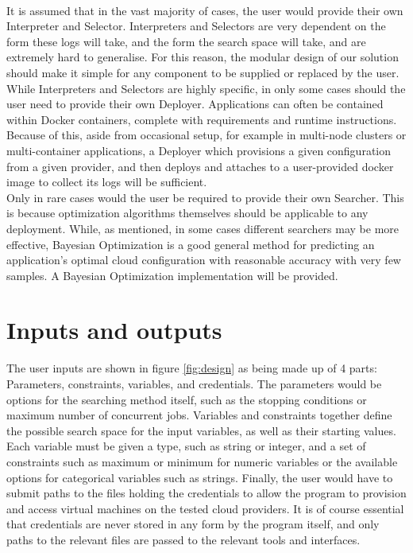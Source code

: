 \documentclass{report}
\begin{document}
\paragraph{}
It is assumed that in the vast majority of cases, the user would provide their own Interpreter and Selector. Interpreters and Selectors are very dependent on the form these logs will take, and the form the search space will take, and are extremely hard to generalise. For this reason, the modular design of our solution should make it simple for any component to be supplied or replaced by the user.  \\
While Interpreters and Selectors are highly specific, in only some cases should the user need to provide their own Deployer. Applications can often be contained within Docker containers, complete with requirements and runtime instructions. Because of this, aside from occasional setup, for example in multi-node clusters or multi-container applications, a Deployer which provisions a given configuration from a given provider, and then deploys and attaches to a user-provided docker image to collect its logs will be sufficient.  \\
Only in rare cases would the user be required to provide their own Searcher. This is because optimization algorithms themselves should be applicable to any deployment. While, as mentioned, in some cases different searchers may be more effective, Bayesian Optimization is a good general method for predicting an application's optimal cloud configuration with reasonable accuracy with very few samples. A Bayesian Optimization implementation will be provided.


\section{Inputs and outputs}
The user inputs are shown in figure \ref{fig:design} as being made up of 4 parts: Parameters, constraints, variables, and credentials. The parameters would be options for the searching method itself, such as the stopping conditions or maximum number of concurrent jobs. Variables and constraints together define the possible search space for the input variables, as well as their starting values. Each variable must be given a type, such as string or integer, and a set of constraints such as maximum or minimum for numeric variables or the available options for categorical variables such as strings. Finally, the user would have to submit paths to the files holding the credentials to allow the program to provision and access virtual machines on the tested cloud providers. It is of course essential that credentials are never stored in any form by the program itself, and only paths to the relevant files are passed to the relevant tools and interfaces.
\end{document}
